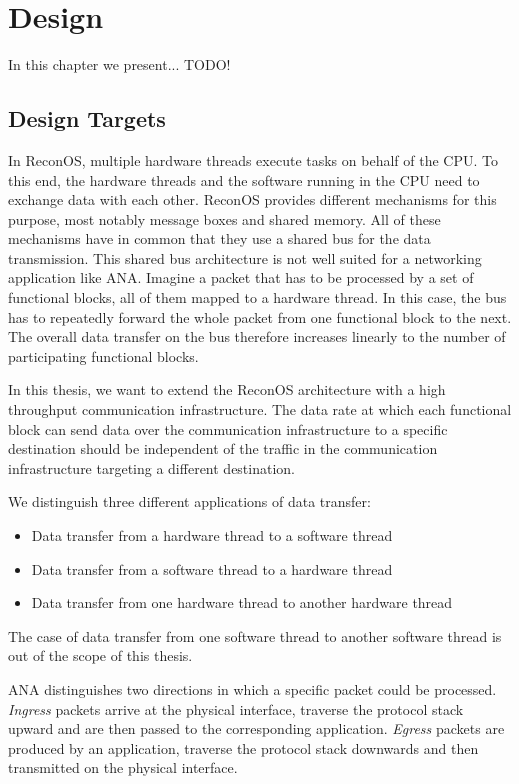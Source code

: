 \chapter{\label{design}Design}

In this chapter we present... TODO!

\section{\label{designTargets}Design Targets}

In ReconOS, multiple hardware threads execute tasks on behalf of the CPU. To this end, the hardware threads and the software running in the CPU need to exchange data with each other. ReconOS provides different mechanisms for this purpose, most notably message boxes and shared memory. All of these mechanisms have in common that they use a shared bus for the data transmission. This shared bus architecture is not well suited for a networking application like ANA. Imagine a packet that has to be processed by a set of functional blocks, all of them mapped to a hardware thread. In this case, the bus has to repeatedly forward the whole packet from one functional block to the next. The overall data transfer on the bus therefore increases linearly to the number of participating functional blocks.

In this thesis, we want to extend the ReconOS architecture with a high throughput communication infrastructure. The data rate at which each functional block can send data over the communication infrastructure to a specific destination should be independent of the traffic in the communication infrastructure targeting a different destination.

We distinguish three different applications of data transfer:
\begin{itemize}
	\item Data transfer from a hardware thread to a software thread
	\item Data transfer from a software thread to a hardware thread
	\item Data transfer from one hardware thread to another hardware thread
\end{itemize}
The case of data transfer from one software thread to another software thread is out of the scope of this thesis.

ANA distinguishes two directions in which a specific packet could be processed. \textit{Ingress} packets arrive at the physical interface, traverse the protocol stack upward and are then passed to the corresponding application. \textit{Egress} packets are produced by an application, traverse the protocol stack downwards and then transmitted on the physical interface.

